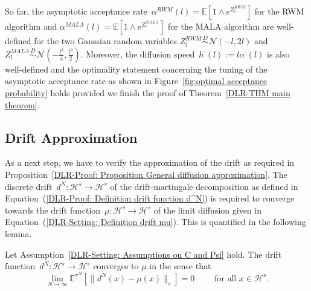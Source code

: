 So far, the asymptotic acceptance rate~$\alpha^{RWM}(l) = \mathbb{E}[1 \wedge e^{Z_l^{RWM}}]$ for the RWM algorithm and $\alpha^{MALA}(l) = \mathbb{E}[1 \wedge e^{Z_l^{MALA}}]$ for the MALA algorithm are well-defined for the two Gaussian random variables $Z_l^{RWM} \stackrel{D}{\sim} \mathcal{N}(- l, 2l)$ and $ Z_l^{MALA} \stackrel{D}{\sim} \mathcal{N}(- \tfrac{l^3}{4}, \tfrac{l^3}{2})$. Moreover, the diffusion speed~$h^{\cdot}(l) := l \alpha^{\cdot}(l)$ is also well-defined and the optimality statement concerning the tuning of the asymptotic acceptance rate as shown in Figure~\ref{fig:optimal acceptance probability} holds provided we finish the proof of Theorem~\ref{DLR-THM main theorem}.




\subsection{Drift Approximation}
\label{sec:sub:DLR - Drift Approximation}

As a next step, we have to verify the approximation of the drift as required in Proposition~\ref{DLR-Proof: Proposition General diffusion approximation}. The discrete drift~$d^N : \mathcal{H}^s \to \mathcal{H}^s$ of the drift-martingale decomposition as defined in Equation~(\ref{DLR-Proof: Definition drift function d^N}) is required to converge towards the drift function~$\mu : \mathcal{H}^s \to \mathcal{H}^s$ of the limit diffusion given in Equation~(\ref{DLR-Setting: Definition drift mu}). This is quantified in the following lemma.

\begin{lemma}\autocite[Lemma 4.7]{Pillai2012}
  \label{DLR: Lemma Dirft approximation}
  Let Assumption~\ref{DLR-Setting: Assumptions on C and Psi} hold. The drift function~$d^N : \mathcal{H}^s \to \mathcal{H}^s$ converges to $\mu$ in the sense that
     \begin{equation*}
      \lim_{N \to \infty} \mathbb{E}^{\pi^N}[ \|  d^N(x) - \mu(x) \|_{s} ] = 0 \qquad \text{ for all } x \in \mathcal{H}^s.
    \end{equation*}
\end{lemma}

